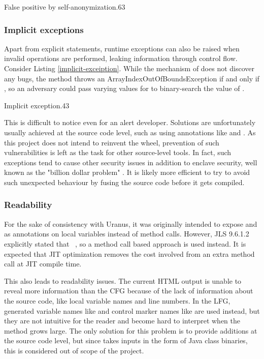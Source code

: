 {False positive by self-anonymization}{.6}{3}

\subsubsection{Implicit exceptions}
Apart from explicit  statements,
runtime exceptions can also be raised when invalid operations are performed,
leaking information through control flow.
Consider Listing \ref{implicit-exceiption}.
While the mechanism of \pname{} does not discover any bugs,
the method throws an ArrayIndexOutOfBoundsException
if and only if ,
so an adversary could pass varying values for 
to binary-search the value of .

{Implicit exception}{.4}{3}

This is difficult to notice even for an alert developer.
Solutions are unfortunately usually achieved at the source code level,
such as using annotations like  and .
As this project does not intend to reinvent the wheel,
prevention of such vulnerabilities is left as the task for other source-level tools.
In fact, such exceptions tend to cause other security issues in addition to enclave security,
well known as the "billion dollar problem" \cite{nullbillion}.
It is likely more efficient to try to avoid such unexpected behaviour
by fusing the source code before it gets compiled.

\subsubsection{Readability}
For the sake of consistency with Uranus,
it was originally intended to expose  and 
as annotations on local variables instead of method calls.
However, \ac{JLS} 9.6.1.2 explicitly stated that
~\cite{jls},
so a method call based approach is used instead.
It is expected that \ac{JIT} optimization removes the cost
involved from an extra method call at \ac{JIT} compile time.

This also leads to readability issues.
The current HTML output is unable to reveal more information than the \ac{CFG}
because of the lack of information about the source code,
like local variable names and line numbers.
In the \ac{LFG}, generated variable names like 
and control marker names like  are used instead,
but they are not intuitive for the reader
and become hard to interpret when the method grows large.
The only solution for this problem is to provide additions at the source code level,
but since \pname{} takes inputs in the form of Java class binaries,
this is considered out of scope of the project.

